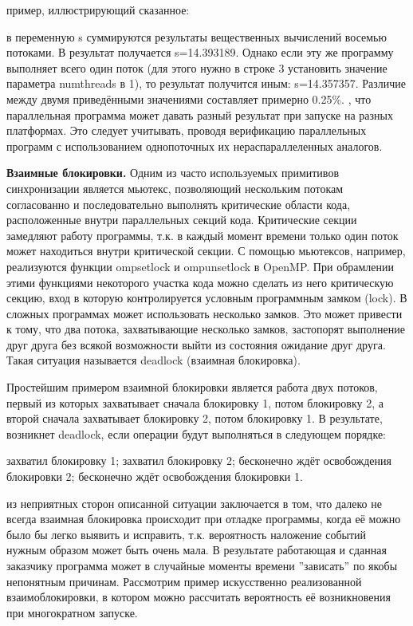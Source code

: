 {	 пример, иллюстрирующий сказанное:
	\begin{figure}[H]
		
	\end{figure}
	 в переменную s суммируются результаты вещественных вычислений восемью потоками. В результат получается s=14.393189. Однако если эту же программу выполняет всего один поток (для этого нужно в строке 3 установить значение параметра num\textunderscore threads в 1), то результат получится иным: s=14.357357. Различие между двумя приведёнными значениями составляет примерно 0.25\%. 
	, что параллельная программа может давать разный результат при запуске на разных платформах. Это следует учитывать, проводя верификацию параллельных программ с использованием однопоточных их нераспараллеленных аналогов.
	\par\textbf{Взаимные блокировки.} Одним из часто используемых примитивов синхронизации является мьютекс, позволяющий нескольким потокам согласованно и последовательно выполнять критические области кода, расположенные внутри параллельных секций кода. Критические секции замедляют работу программы, т.к. в каждый момент времени только один поток может находиться внутри критической секции. С помощью мьютексов, например, реализуются функции omp\textunderscore set\textunderscore lock и omp\textunderscore unset\textunderscore lock в OpenMP. При обрамлении этими функциями некоторого участка кода можно сделать из него критическую секцию, вход в которую контролируется условным программным замком (lock). В сложных программах может использовать несколько замков. Это может привести к тому, что два потока, захватывающие несколько замков, застопорят выполнение друг друга без всякой возможности выйти из состояния ожидание друг друга. Такая ситуация называется deadlock (взаимная блокировка).
	\par Простейшим примером взаимной блокировки является работа двух потоков, первый из которых захватывает сначала блокировку 1, потом блокировку 2, а второй сначала захватывает блокировку 2, потом блокировку 1. В результате, возникнет deadlock, если операции будут выполняться в следующем порядке: 
	\begin{itemize}
		 захватил блокировку 1;
		 захватил блокировку 2;
		 бесконечно ждёт освобождения блокировки 2;
		 бесконечно ждёт освобождения блокировки 1.
	\end{itemize}
	 из неприятных сторон описанной ситуации заключается в том, что далеко не всегда взаимная блокировка происходит при отладке программы, когда её можно было бы легко выявить и исправить, т.к. вероятность наложение событий нужным образом может быть очень мала. В результате работающая и сданная заказчику программа может в случайные моменты времени ''зависать'' по якобы непонятным причинам. Рассмотрим пример искусственно реализованной взаимоблокировки, в котором можно рассчитать вероятность её возникновения при многократном запуске.
}
